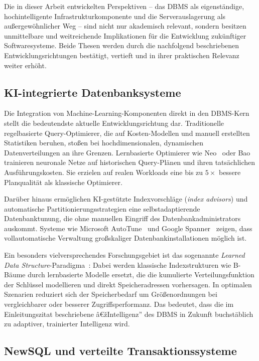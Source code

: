 ﻿\documentclass[a4paper,12pt]{article}
\theoremstyle{definition}
\begin{document}
Die in dieser Arbeit entwickelten Perspektiven -- das DBMS als eigenständige, hochintelligente Infrastrukturkomponente und die Serverauslagerung als außergewöhnlicher Weg -- sind nicht nur akademisch relevant, sondern besitzen unmittelbare und weitreichende Implikationen für die Entwicklung zukünftiger Softwaresysteme. Beide Thesen werden durch die nachfolgend beschriebenen Entwicklungsrichtungen bestätigt, vertieft und in ihrer praktischen Relevanz weiter erhöht.

\subsection{KI-integrierte Datenbanksysteme}

Die Integration von Machine-Learning-Komponenten direkt in den DBMS-Kern stellt die bedeutendste aktuelle Entwicklungsrichtung dar. Traditionelle regelbasierte Query-Optimierer, die auf Kosten-Modellen und manuell erstellten Statistiken beruhen, stoßen bei hochdimensionalen, dynamischen Datenverteilungen an ihre Grenzen. Lernbasierte Optimierer wie Neo~\cite{marcus2019neo} oder Bao~\cite{marcus2021bao} trainieren neuronale Netze auf historischen Query-Plänen und ihren tatsächlichen Ausführungskosten. Sie erzielen auf realen Workloads eine bis zu $5\times$ bessere Planqualität als klassische Optimierer.

Darüber hinaus ermöglichen KI-gestützte Indexvorschläge (\emph{index advisors}) und automatische Partitionierungsstrategien eine selbstadaptierende Datenbanktunung, die ohne manuellen Eingriff des Datenbankadministrators auskommt. Systeme wie Microsoft AutoTune~\cite{chaudhuri1997autoadmin} und Google Spanner~\cite{corbett2013spanner} zeigen, dass vollautomatische Verwaltung großskaliger Datenbankinstallationen möglich ist.

Ein besonders vielversprechendes Forschungsgebiet ist das sogenannte \emph{Learned Data Structure}-Paradigma~\cite{kraska2018learned}: Dabei werden klassische Indexstrukturen wie B-Bäume durch lernbasierte Modelle ersetzt, die die kumulierte Verteilungsfunktion der Schlüssel modellieren und direkt Speicheradressen vorhersagen. In optimalen Szenarien reduziert sich der Speicherbedarf um Größenordnungen bei vergleichbarer oder besserer Zugriffsperformanz. Das bedeutet, dass die im Einleitungszitat beschriebene â€žIntelligenz'' des DBMS in Zukunft buchstäblich zu adaptiver, trainierter Intelligenz wird.

\subsection{NewSQL und verteilte Transaktionssysteme}
\end{document}
